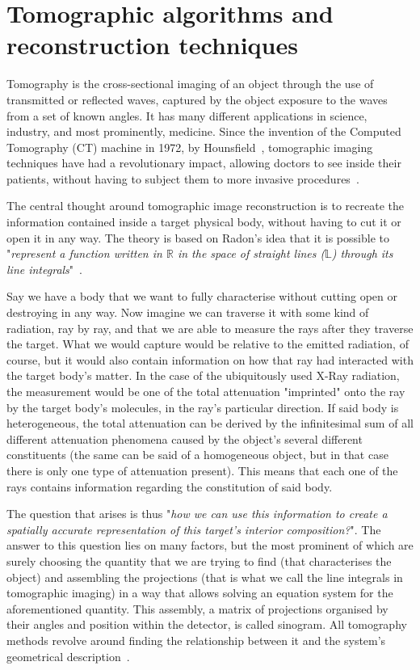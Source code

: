 \section{Tomographic algorithms and reconstruction techniques}%
\label{sec:tomographic_algorithms_and_reconstruction_techniques}

Tomography is the cross-sectional imaging of an object through the use
of transmitted or reflected waves, captured by the object exposure to
the waves from a set of known angles. It has many different applications
in science, industry, and most prominently, medicine. Since the
invention of the Computed Tomography (\gls{CT}) machine in 1972, by
Hounsfield~\cite{Gunderman2006}, tomographic imaging techniques have had
a revolutionary impact, allowing doctors to see inside their patients,
without having to subject them to more invasive
procedures~\cite{Kak2001}.

The central thought around tomographic image reconstruction is to
recreate the information contained inside a target physical body,
without having to cut it or open it in any way. The theory is based on
Radon's idea that it is possible to "\emph{represent a function written
in $\mathbb{R}$ in the space of straight lines ($\mathbb{L}$) through
its line integrals}"~\cite{Radon1986}.

Say we have a body that we want to fully characterise without cutting
open or destroying in any way. Now imagine we can traverse it with some
kind of radiation, ray by ray, and that we are able to measure the rays
after they traverse the target. What we would capture would be relative
to the emitted radiation, of course, but it would also contain
information on how that ray had interacted with the target body's
matter. In the case of the ubiquitously used X-Ray radiation, the
measurement would be one of the total attenuation "imprinted" onto the
ray by the target body's molecules, in the ray's particular direction.
If said body is heterogeneous, the total attenuation can be derived by
the infinitesimal sum of all different attenuation phenomena caused by
the object's several different constituents (the same can be said of a
homogeneous object, but in that case there is only one type of
attenuation present). This means that each one of the rays contains
information regarding the constitution of said body.

The question that arises is thus "\emph{how we can use this information
to create a spatially accurate representation of this target's interior
composition?}". The answer to this question lies on many factors, but
the most prominent of which are surely choosing the quantity that we are
trying to find (that characterises the object) and assembling the
projections (that is what we call the line integrals in tomographic
imaging) in a way that allows solving an equation system for the
aforementioned quantity. This assembly, a matrix of projections
organised by their angles and position within the detector, is called
sinogram. All tomography methods revolve around finding the relationship
between it and the system's geometrical description~\cite{Bruyant2002,
Kak2001, Herman1973, Herman1995, Herman2009, Defrise2003}.

